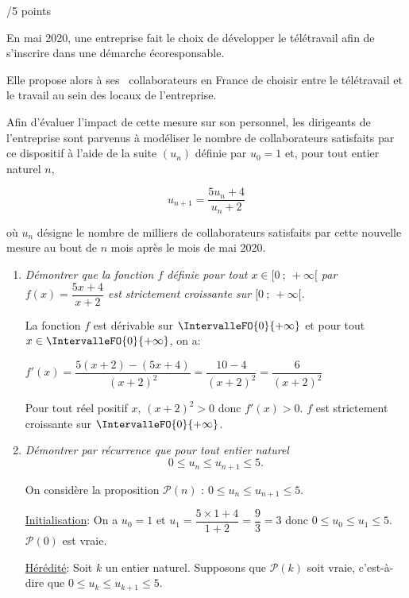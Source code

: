 \documentclass[a4paper]{article}
\begin{document}
\begin{exerciceinterro}{\hspace{2cm}/5 points}{}


En mai 2020, une entreprise fait le choix de développer le télétravail afin de s'inscrire dans une démarche écoresponsable.

Elle propose alors à ses ~collaborateurs en France de choisir entre le télétravail et le travail au sein des locaux de l'entreprise.

\medskip

Afin d'évaluer l'impact de cette mesure sur son personnel, les dirigeants de l'entreprise sont parvenus à modéliser le nombre de collaborateurs satisfaits par ce dispositif à l'aide de la suite 
$\left(u_n\right)$ définie par $u_0 = 1$ et, pour tout entier naturel $n$,

\[u_{n+1}  = \dfrac{5u_n + 4}{u_n + 2}\]

où $u_n$ désigne le nombre de milliers de collaborateurs satisfaits par cette nouvelle mesure au bout de $n$ mois après le mois de mai 2020.

\medskip

\begin{enumerate}
\item \textit{Démontrer que la fonction $f$ définie pour tout $x \in  [0~;~ +\infty[$ par $f(x) = \dfrac{5x+4}{x+2}$ est 
strictement croissante sur $[0~;~+ \infty[$.}

	La fonction $f$ est dérivable sur $\IntervalleFO{0}{+\infty}$ et pour tout $x\in\IntervalleFO{0}{+\infty}$, on a:
	
	$f'(x)=\dfrac{5(x+2)-(5x+4)}{(x+2)^2}=\dfrac{10-4}{(x+2)^2}=\dfrac{6}{(x+2)^2}$

	Pour tout réel positif $x$, $(x+2)^2>0$ donc $f'(x)>0$. $f$ est strictement croissante sur $\IntervalleFO{0}{+\infty}$.



		\item \textit{Démontrer par récurrence que pour tout entier naturel 
		\[0 \leqslant u_n \leqslant u_{n+1}  \leqslant  5.\]
		}

		On considère la proposition $\mathcal{P}(n)$ : $0 \leqslant u_n \leqslant u_{n+1}  \leqslant  5$.

		\underline{Initialisation}:
		On a $u_0=1$ et $u_1=\dfrac{5\times 1+4}{1+2}=\dfrac{9}{3}=3$ donc $0 \leqslant u_0 \leqslant u_1 \leqslant  5$. $\mathcal{P}(0)$ est vraie.

		\underline{Hérédité}:
		Soit $k$ un entier naturel. Supposons que $\mathcal{P}(k)$ soit vraie, c'est-à-dire que $0 \leqslant u_k \leqslant u_{k+1}  \leqslant  5$.


\end{enumerate}
\end{exerciceinterro}
\end{document}
